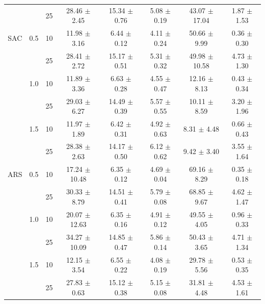 \documentclass[manuscript,screen,review]{acmart}
\begin{document}
\begin{table}[ht]
{\begin{tabular}{cccccccc}
    &     & 25 &  28.46 $\pm$    2.45 &   15.34 $\pm$   0.76 &           5.08 $\pm$   0.19 &    43.07 $\pm$   17.04 &                    1.87 $\pm$   1.53 \\
SAC & 0.5 & 10 &  11.98 $\pm$    3.16 &    6.44 $\pm$   0.12 &           4.11 $\pm$   0.24 &    50.66 $\pm$    9.99 &                    0.36 $\pm$   0.30 \\
    &     & 25 &  28.41 $\pm$    2.72 &   15.17 $\pm$   0.51 &           5.31 $\pm$   0.32 &    49.98 $\pm$   10.58 &                    4.73 $\pm$   1.30 \\
    & 1.0 & 10 &  11.89 $\pm$    3.36 &    6.63 $\pm$   0.28 &           4.55 $\pm$   0.47 &    12.16 $\pm$    8.13 &                    0.43 $\pm$   0.34 \\
    &     & 25 &  29.03 $\pm$    6.27 &   14.49 $\pm$   0.39 &           5.57 $\pm$   0.55 &    10.11 $\pm$    8.59 &                    3.20 $\pm$   1.96 \\
    & 1.5 & 10 &  11.97 $\pm$    1.89 &    6.42 $\pm$   0.31 &           4.92 $\pm$   0.63 &     8.31 $\pm$    4.48 &                    0.66 $\pm$   0.43 \\
    &     & 25 &  28.38 $\pm$    2.63 &   14.17 $\pm$   0.50 &           6.12 $\pm$   0.62 &     9.42 $\pm$    3.40 &                    3.55 $\pm$   1.64 \\
ARS & 0.5 & 10 &  17.24 $\pm$   10.48 &    6.35 $\pm$   0.12 &           4.69 $\pm$   0.04 &    69.16 $\pm$    8.29 &                    0.35 $\pm$   0.18 \\
    &     & 25 &  30.33 $\pm$    8.79 &   14.51 $\pm$   0.41 &           5.79 $\pm$   0.08 &    68.85 $\pm$    9.67 &                    4.62 $\pm$   1.47 \\
    & 1.0 & 10 &  20.07 $\pm$   12.63 &    6.35 $\pm$   0.16 &           4.91 $\pm$   0.12 &    49.55 $\pm$    4.05 &                    0.96 $\pm$   0.33 \\
    &     & 25 &  34.27 $\pm$   10.09 &   14.85 $\pm$   0.47 &           5.86 $\pm$   0.14 &    50.43 $\pm$    3.65 &                    4.71 $\pm$   1.34 \\
    & 1.5 & 10 &  12.15 $\pm$    3.54 &    6.55 $\pm$   0.22 &           4.08 $\pm$   0.19 &    29.78 $\pm$    5.56 &                    0.53 $\pm$   0.35 \\
    &     & 25 &  27.83 $\pm$    0.63 &   15.12 $\pm$   0.38 &           5.15 $\pm$   0.08 &    31.81 $\pm$    4.48 &                    4.53 $\pm$   1.61 \\


\end{tabular}}
\end{table}
\end{document}
